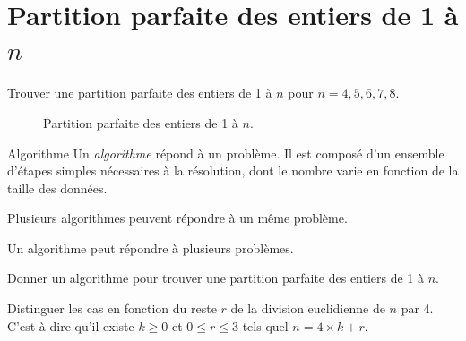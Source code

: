 \documentclass[11pt]{article}
\begin{document}
\section{Partition parfaite des entiers de 1 à $n$}

  \begin{exercice}{}
    Trouver une partition parfaite des entiers de 1 à $n$ pour $n =4, 5, 6, 7, 8$.
  \end{exercice}


  \begin{figure}[htbp]
    \centering
    \resizebox{0.6\linewidth}{!}{
      
    }
    \caption{Partition parfaite des entiers de 1 à $n$.}
  \end{figure}


  \begin{definition}{Algorithme}
    Un \emph{algorithme} répond à un problème. Il est composé d’un ensemble d’étapes simples nécessaires à la résolution, dont le nombre varie en fonction de la taille des données.
  \end{definition}

  \begin{remarque}{}
    Plusieurs algorithmes peuvent répondre à un même problème.
  \end{remarque}

  \begin{remarque}{}
    Un algorithme peut répondre à plusieurs problèmes.
  \end{remarque}

  \begin{exercice}{}
    Donner un algorithme pour trouver une partition parfaite des entiers de 1 à $n$.
  \end{exercice}

  \begin{indice}
    Distinguer les cas en fonction du reste $r$ de la division euclidienne de $n$ par 4. C'est-à-dire qu'il existe $k \geq 0$ et $0 \leq r \leq 3$ tels quel $n = 4 \times k + r$.
  \end{indice}
\end{document}
